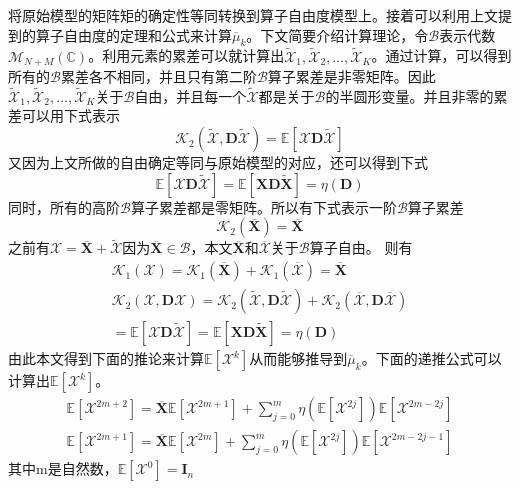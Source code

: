 \documentclass[bachelor,nocolorlinks, printoneside]{seuthesis} %
\begin{document}
\begin{Main}
将原始模型的矩阵矩的确定性等同转换到算子自由度模型上。接着可以利用上文提到的算子自由度的定理和公式来计算$\overline{\mu}_k$。下文简要介绍计算理论，令$\mathcal{B}$表示代数$\mathcal{M}_{N+M}(\mathbb{C})$。利用元素的累差可以就计算出$\tilde{\mathcal{X}}_1,\tilde{\mathcal{X}}_2,\ldots,\tilde{\mathcal{X}}_K$。通过计算，可以得到所有的$\mathcal{B}$累差各不相同，并且只有第二阶$\mathcal{B}$算子累差是非零矩阵。因此$\tilde{\mathcal{X}}_1,\tilde{\mathcal{X}}_2,\ldots,\tilde{\mathcal{X}}_K$关于$\mathcal{B}$自由，并且每一个$\tilde{\mathcal{X}}$都是关于$\mathcal{B}$的半圆形变量。并且非零的累差可以用下式表示
\begin{equation}\label{key}
\mathcal{K}_2(\tilde{\mathcal{X}},\mathbf{D}\tilde{\mathcal{X}})=\mathbb{E}[\mathcal{X}\mathbf{D}\tilde{\mathcal{X}}]
\end{equation}
又因为上文所做的自由确定等同与原始模型的对应，还可以得到下式
\begin{equation}\label{key}
\mathbb{E}[\mathcal{X}\mathbf{D}\tilde{\mathcal{X}}]=
\mathbb{E}[\mathbf{X}\mathbf{D}\tilde{\mathbf{X}}] = \eta(\mathbf{D})
\end{equation}
同时，所有的高阶$\mathcal{B}$算子累差都是零矩阵。所以有下式表示一阶$\mathcal{B}$算子累差
\begin{equation}\label{key}
\mathcal{K}_2(\overline{\mathbf{X}}) = \overline{\mathbf{X}}
\end{equation}
之前有$\mathcal{X}=\overline{\mathbf{X}}+\tilde{\mathcal{X}}$因为$\overline{\mathbf{X}}\in \mathcal{B}$，本文$\overline{\mathbf{X}}$和$\overline{\mathcal{X}}$关于$\mathcal{B}$算子自由。
则有
\begin{gather}\label{key}
\mathcal{K}_1(\mathcal{X}) = \mathcal{K}_1(\overline{\mathbf{X}}) + \mathcal{K}_1(\overline{\mathcal{X}}) = \overline{\mathbf{X}} \nonumber\\
\mathcal{K}_2({\mathcal{X}},\mathbf{D}{\mathcal{X}})=\mathcal{K}_2(\tilde{\mathcal{X}},\mathbf{D}\tilde{\mathcal{X}}) + \mathcal{K}_2(\overline{\mathcal{X}},\mathbf{D}\overline{\mathcal{X}})\\ =\mathbb{E}[\mathcal{X}\mathbf{D}\tilde{\mathcal{X}}]\nonumber = 
\mathbb{E}[\mathbf{X}\mathbf{D}\tilde{\mathbf{X}}] = \eta(\mathbf{D})
\end{gather}
由此本文得到下面的推论来计算$\mathbb{E}[\mathcal{X}^k]$从而能够推导到$\overline{\mu}_k$。下面的递推公式可以计算出$\mathbb{E}[\mathcal{X}^k]$。
\begin{eqnarray}\label{key}
\mathbb{E}[\mathcal{X}^{2m+2}]=\overline{\mathbf{X}}\mathbb{E}[\mathcal{X}^{2m+1}]+\sum_{j=0}^{m}\eta(\mathbb{E}[\mathcal{X}^{2j}])\mathbb{E}[\mathcal{X}^{2m-2j}]  \\
\mathbb{E}[\mathcal{X}^{2m+1}]=\overline{\mathbf{X}}\mathbb{E}[\mathcal{X}^{2m}]+\sum_{j=0}^{m}\eta(\mathbb{E}[\mathcal{X}^{2j}])\mathbb{E}[\mathcal{X}^{2m-2j-1}] 
\end{eqnarray}
其中m是自然数，$\mathbb{E}[\mathcal{X}^0] = \mathbf{I}_n$


\end{Main}
\end{document}

